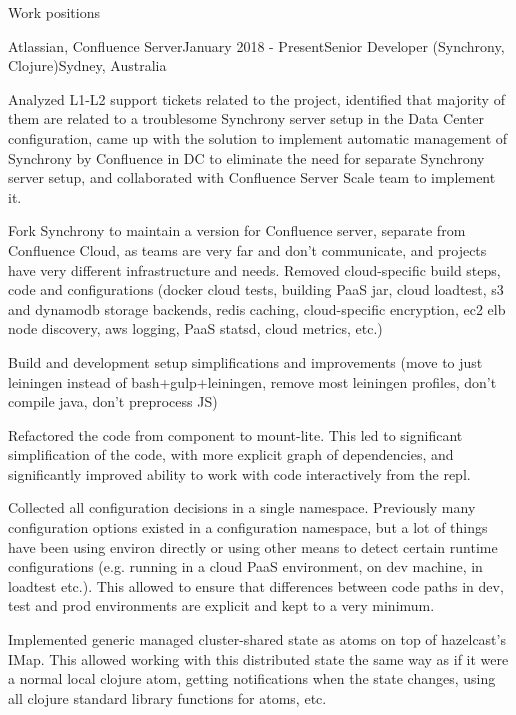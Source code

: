 \documentclass{resume} %
\begin{document}
\begin{rSection}{Work positions}

\begin{rSubsection}{Atlassian, Confluence Server}{January 2018 - Present}{Senior Developer (Synchrony, Clojure)}{Sydney, Australia}
\item Analyzed L1-L2 support tickets related to the project, identified that majority of them are related to a troublesome Synchrony server setup in the Data Center configuration, came up with the solution to implement automatic management of Synchrony by Confluence in DC to eliminate the need for separate Synchrony server setup, and collaborated with Confluence Server Scale team to implement it.
\item Fork Synchrony to maintain a version for Confluence server, separate from Confluence Cloud, as teams are very far and don't communicate, and projects have very different infrastructure and needs. Removed cloud-specific build steps, code and configurations (docker cloud tests, building PaaS jar, cloud loadtest, s3 and dynamodb storage backends, redis caching, cloud-specific encryption, ec2 elb node discovery, aws logging, PaaS statsd, cloud metrics, etc.)
\item Build and development setup simplifications and improvements (move to just leiningen instead of bash+gulp+leiningen, remove most leiningen profiles, don't compile java, don't preprocess JS)
\item Refactored the code from component to mount-lite. This led to significant simplification of the code, with more explicit graph of dependencies, and significantly improved ability to work with code interactively from the repl.
\item Collected all configuration decisions in a single namespace. Previously many configuration options existed in a configuration namespace, but a lot of things have been using environ directly or using other means to detect certain runtime configurations (e.g. running in a cloud PaaS environment, on dev machine, in loadtest etc.). This allowed to ensure that differences between code paths in dev, test and prod environments are explicit and kept to a very minimum.
\item Implemented generic managed cluster-shared state as atoms on top of hazelcast's IMap. This allowed working with this distributed state the same way as if it were a normal local clojure atom, getting notifications when the state changes, using all clojure standard library functions for atoms, etc.

\end{rSubsection}
\end{rSection}
\end{document}

